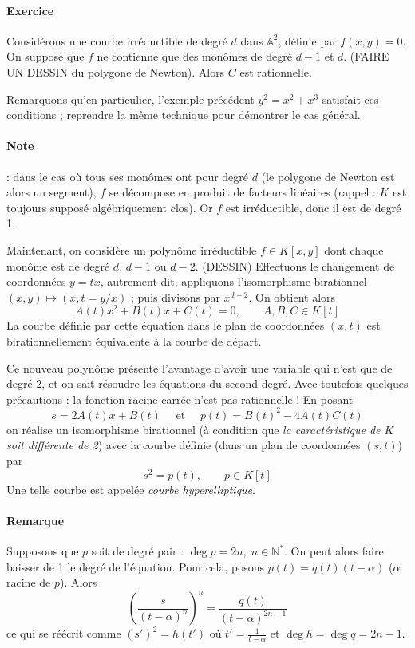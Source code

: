 \documentclass[a4paper, 11pt]{article}
\theoremstyle{definition}
\newcommand{\nat}{\mathbb{N}}
\newcommand{\aff}{\mathbb{A}}
\begin{document}
\paragraph{Exercice} Considérons une courbe irréductible de degré $d$
dans $\aff^2$, définie par $f(x,y)=0$. On suppose que $f$ ne contienne
que des monômes de degré $d-1$ et $d$. (FAIRE UN DESSIN du polygone de
Newton). Alors $C$ est rationnelle.

Remarquons qu'en particulier, l'exemple précédent $y^2 = x^2 + x^3$
satisfait ces conditions ; reprendre la même technique pour démontrer
le cas général.

\paragraph{Note} : dans le cas où tous ses monômes ont pour degré $d$
(le polygone de Newton est alors un segment), $f$ se décompose en
produit de facteurs linéaires (rappel : $K$ est toujours supposé
algébriquement clos). Or $f$ est irréductible, donc il est de degré 1.

Maintenant, on considère un polynôme irréductible $f \in K[x,y]$ dont
chaque monôme est de degré $d$, $d-1$ ou $d-2$. (DESSIN) Effectuons le
changement de coordonnées $y = tx$, autrement dit, appliquons
l'isomorphisme birationnel $(x,y) \mapsto (x, t = y/x)$ ; puis
divisons par $x^{d-2}$. On obtient alors
\[ A(t)x^2 + B(t)x + C(t) = 0, \qquad A,B,C \in K[t] \]
La courbe définie par cette équation dans le plan de coordonnées
$(x,t)$ est birationnellement équivalente à la courbe de départ.

Ce nouveau polynôme présente l'avantage d'avoir une variable qui n'est
que de degré 2, et on sait résoudre les équations du second
degré. Avec toutefois quelques précautions : la fonction racine carrée
n'est pas rationnelle ! En posant
\[ s = 2A(t)x + B(t) \quad\text{ et }\quad p(t) = B(t)^2 -
4A(t)C(t) \]
on réalise un isomorphisme birationnel (à condition que \emph{la
  caractéristique de $K$ soit différente de 2}) avec la courbe définie
(dans un plan de coordonnées $(s,t)$) par
\[ s^2 = p(t), \qquad p \in K[t] \]
Une telle courbe est appelée \emph{courbe hyperelliptique}.

\paragraph{Remarque} Supposons que $p$ soit de degré pair :
$\deg p = 2n,\; n \in \nat^*$. On peut alors faire baisser de 1 le degré
de l'équation. Pour cela, posons $p(t) = q(t)(t-\alpha)$ ($\alpha$
racine de $p$). Alors
\[ \left(\frac{s}{(t-\alpha)^n}\right)^n =
\frac{q(t)}{(t-\alpha)^{2n-1}} \]
ce qui se réécrit comme $(s')^2 = h(t')$ où $t' = \frac{1}{t-\alpha}$ et
$\deg h = \deg q = 2n-1$.
\end{document}
